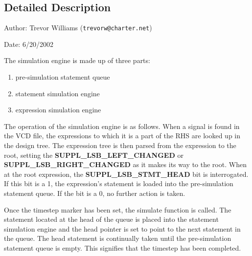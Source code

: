 \subsection{Detailed Description}
\begin{Desc}
\item[Author:]Trevor Williams ({\tt trevorw@charter.net}) \end{Desc}
\begin{Desc}
\item[Date:]6/20/2002\end{Desc}
\begin{Desc}
\item[]The simulation engine is made up of three parts:\begin{enumerate}
\item pre-simulation statement queue\item statement simulation engine\item expression simulation engine\end{enumerate}
\end{Desc}
\begin{Desc}
\item[]The operation of the simulation engine is as follows. When a signal is found in the VCD file, the expressions to which it is a part of the RHS are looked up in the design tree. The expression tree is then parsed from the expression to the root, setting the {\bf SUPPL\_\-LSB\_\-LEFT\_\-CHANGED} or {\bf SUPPL\_\-LSB\_\-RIGHT\_\-CHANGED} as it makes its way to the root. When at the root expression, the {\bf SUPPL\_\-LSB\_\-STMT\_\-HEAD} bit is interrogated. If this bit is a 1, the expression's statement is loaded into the pre-simulation statement queue. If the bit is a 0, no further action is taken.\end{Desc}
\begin{Desc}
\item[]Once the timestep marker has been set, the simulate function is called. The statement located at the head of the queue is placed into the statement simulation engine and the head pointer is set to point to the next statement in the queue. The head statement is continually taken until the pre-simulation statement queue is empty. This signifies that the timestep has been completed.\end{Desc}
